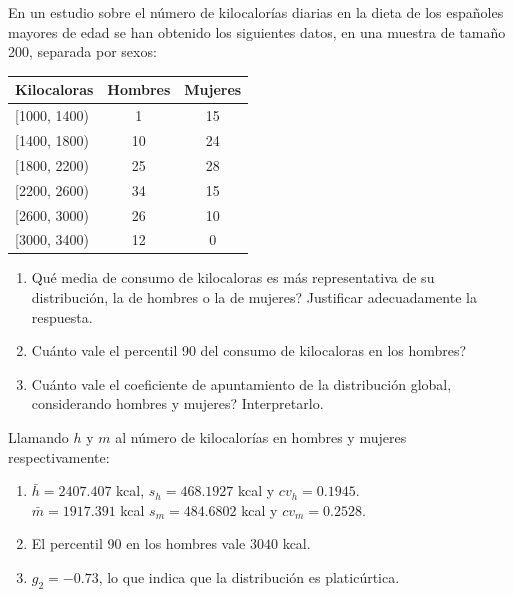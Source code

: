 {En un estudio sobre el número de kilocalorías diarias en la dieta de los españoles mayores de edad se han obtenido los siguientes datos, en
una muestra de tamaño 200, separada por sexos:
\begin{center}
\begin{tabular}{|l|c|c|}
\hline
Kilocaloras & Hombres & Mujeres \\
\hline
[1000, 1400) & 1 & 15\\
\hline
[1400, 1800) & 10 & 24\\
\hline
[1800, 2200) & 25 & 28\\
\hline
[2200, 2600) & 34 & 15\\
\hline
[2600, 3000) & 26 & 10\\
\hline
[3000, 3400) & 12 & 0\\
\hline
\end{tabular}
\end{center}

\begin{enumerate}
\item Qué media de consumo de kilocaloras es más representativa de su distribución, la de hombres o la de mujeres? Justificar adecuadamente
la respuesta.
\item Cuánto vale el percentil 90 del consumo de kilocaloras en los hombres?
\item Cuánto vale el coeficiente de apuntamiento de la distribución global, considerando hombres y mujeres? Interpretarlo.
\end{enumerate}
}
{Llamando $h$ y $m$ al número de kilocalorías en hombres y mujeres respectivamente:
\begin{enumerate}
\item $\bar h=2407.407$ kcal, $s_h=468.1927$ kcal y $cv_h=0.1945$.\\
$\bar m=1917.391$ kcal  $s_m=484.6802$ kcal y $cv_m=0.2528$.
\item El percentil 90 en los hombres vale $3040$ kcal. 
\item $g_2=-0.73$, lo que indica que la distribución es platicúrtica. 
\end{enumerate}
}
{}




